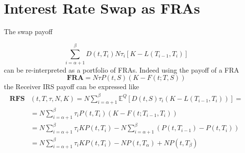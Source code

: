 \documentclass[12pt,a4paper]{article}
\newcommand{\myendproof}{\hfill\qedsymbol}
\begin{document}

\clearpage
\section{Interest Rate Swap as FRAs}

The swap payoff 

\begin{equation}
	\sum_{i=\alpha+1}^{\beta} D(t,T_i)N \tau_i \left[K-L(T_{i-1},T_i)\right]
	\label{eq:payoff_payer_irs}
\end{equation}	
can be re-interpreted as a portfolio of FRAs. Indeed using the payoff of a FRA
\begin{equation}
	\textbf{FRA}= N\tau P(t,S)(K - F(t;T,S))
	\label{eq:fram_payoff_withF}
\end{equation}
the Receiver IRS payoff can be expressed like
\begin{equation}
	\begin{aligned}
		\textbf{RFS}&(t,T,\tau,N,K) = 	N\sum_{i=\alpha+1}^{\beta}\mathbb{E}^Q[D(t,S)\tau_i(K - L(T_{i-1},T_i))]=\\
		&=N\sum_{i=\alpha+1}^{\beta}\tau_i P(t,T_i)(K-F(t;T_{i-1},T_i))\\
		&=N\sum_{i=\alpha+1}^{\beta}\tau_i KP(t,T_i)-N\sum_{i=\alpha+1}^{\beta}(P(t,T_{i-1})-P(t,T_i)) \\
		&=N\sum_{i=\alpha+1}^{\beta}\tau_i KP(t,T_i)-NP(t,T_\alpha)+NP(t,T_\beta)
	\end{aligned}
\label{eq:swap_as_sum_fra}
\end{equation}
\end{document}

